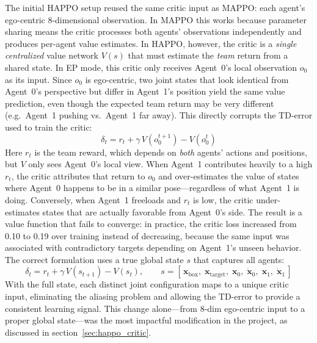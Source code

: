 
The initial HAPPO setup reused the same critic input as MAPPO: each agent's
ego-centric 8-dimensional observation. In MAPPO this works because parameter
sharing means the critic processes both agents' observations independently and
produces per-agent value estimates. In HAPPO, however, the critic is a
\emph{single centralized} value network $V(s)$ that must estimate the
\emph{team} return from a shared state. In EP mode, this critic only receives
Agent~0's local observation $o_0$ as its input. Since $o_0$ is ego-centric, two
joint states that look identical from Agent~0's perspective but differ in
Agent~1's position yield the same value prediction, even though the expected
team return may be very different (e.g.\ Agent~1 pushing vs.\ Agent~1 far
away). This directly corrupts the TD-error used to train the critic:
%
\begin{equation}
  \delta_t = r_t + \gamma\, V(o_0^{t+1}) - V(o_0^{t})
  \label{eq:td_error_broken}
\end{equation}
%
Here $r_t$ is the team reward, which depends on \emph{both} agents' actions and
positions, but $V$ only sees Agent~0's local view. When Agent~1 contributes
heavily to a high $r_t$, the critic attributes that return to $o_0$ and
over-estimates the value of states where Agent~0 happens to be in a similar
pose---regardless of what Agent~1 is doing. Conversely, when Agent~1 freeloads
and $r_t$ is low, the critic under-estimates states that are actually
favorable from Agent~0's side. The result is a value function that fails to
converge: in practice, the critic loss increased from 0.10 to 0.19 over
training instead of decreasing, because the same input was associated with
contradictory targets depending on Agent~1's unseen behavior. The correct
formulation uses a true global state $s$ that captures all agents:
%
\begin{equation}
  \delta_t = r_t + \gamma\, V(s_{t+1}) - V(s_t), \qquad
  s = [\,\mathbf{x}_{\text{box}},\; \mathbf{x}_{\text{target}},\;
       \mathbf{x}_0,\; \dot{\mathbf{x}}_0,\;
       \mathbf{x}_1,\; \dot{\mathbf{x}}_1\,]
  \label{eq:td_error_correct}
\end{equation}
%
With the full state, each distinct joint configuration maps to a unique critic
input, eliminating the aliasing problem and allowing the TD-error to provide a
consistent learning signal. This change alone---from 8-dim ego-centric input to
a proper global state---was the most impactful modification in the project, as
discussed in section~\ref{sec:happo_critic}.
